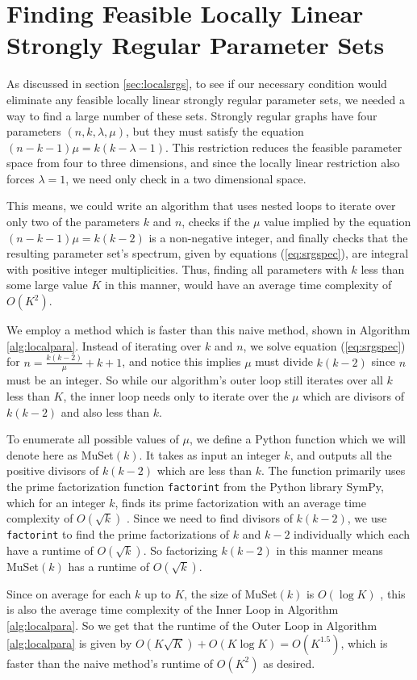\documentclass[12pt]{report}
\theoremstyle{definition}
\begin{document}
\chapter{Finding Feasible Locally Linear Strongly Regular Parameter Sets} \label{ap:llsrg}
As discussed in section \ref{sec:localsrgs}, to see if our necessary condition would eliminate any feasible locally linear strongly regular parameter sets, we needed a way to find a large number of these sets. Strongly regular graphs have four parameters $(n,k,\lambda,\mu)$, but they must satisfy the equation $(n-k-1)\mu=k(k-\lambda-1)$. This restriction reduces the feasible parameter space from four to three dimensions, and since the locally linear restriction also forces $\lambda=1$, we need only check in a two dimensional space.\par
This means, we could write an algorithm that uses nested loops to iterate over only two of the parameters $k$ and $n$, checks if the $\mu$ value implied by the equation\linebreak$(n-k-1)\mu=k(k-2)$ is a non-negative integer, and finally checks that the resulting parameter set's spectrum, given by equations (\ref{eq:srgspec}), are integral with positive integer multiplicities. Thus, finding all parameters with $k$ less than some large value $K$ in this manner, would have an average time complexity of $O(K^2)$.\par
We employ a method which is faster than this naive method, shown in Algorithm \ref{alg:localpara}. Instead of iterating over $k$ and $n$, we solve equation (\ref{eq:srgspec}) for $n=\frac{k(k-2)}{\mu}+k+1$, and notice this implies $\mu$ must divide $k(k-2)$ since $n$ must be an integer. So while our algorithm's outer loop still iterates over all $k$ less than $K$, the inner loop needs only to iterate over the $\mu$ which are divisors of $k(k-2)$ and also less than $k$.\par
To enumerate all possible values of $\mu$, we define a Python function which we will denote here as MuSet$(k)$. It takes as input an integer $k$, and outputs all the positive divisors of $k(k-2)$ which are less than $k$. The function primarily uses the prime factorization function \texttt{factorint} from the Python library SymPy, which for an integer $k$, finds its prime factorization with an average time complexity of $O(\sqrt{k})$ \cite{SymPy}. Since we need to find divisors of $k(k-2)$, we use \texttt{factorint} to find the prime factorizations of $k$ and $k-2$ individually which each have a runtime of $O(\sqrt{k})$. So factorizing $k(k-2)$ in this manner means MuSet$(k)$ has a runtime of $O(\sqrt{k})$.\par
Since on average for each $k$ up to $K$, the size of MuSet$(k)$ is $O(\log K)$ \linebreak \cite[Theorem 3.3]{apostol}, this is also the average time complexity of the Inner Loop in \linebreak Algorithm \ref{alg:localpara}. So we get that the runtime of the Outer Loop in Algorithm \ref{alg:localpara} is given by $O(K\sqrt{K})+O(K\log K)=O(K^{1.5})$, which is faster than the naive method's runtime of $O(K^2)$ as desired.
\end{document}
